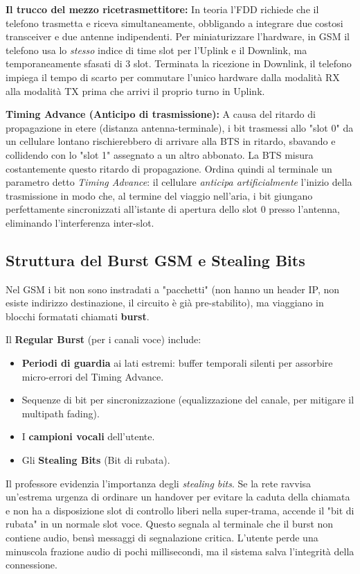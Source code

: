 \textbf{Il trucco del mezzo ricetrasmettitore:} 
In teoria l'FDD richiede che il telefono trasmetta e riceva simultaneamente, obbligando a integrare due costosi transceiver e due antenne indipendenti. Per miniaturizzare l'hardware, in GSM il telefono usa lo \textit{stesso} indice di time slot per l'Uplink e il Downlink, ma temporaneamente sfasati di 3 slot. Terminata la ricezione in Downlink, il telefono impiega il tempo di scarto per commutare l'unico hardware dalla modalità RX alla modalità TX prima che arrivi il proprio turno in Uplink.

\textbf{Timing Advance (Anticipo di trasmissione):}
A causa del ritardo di propagazione in etere (distanza antenna-terminale), i bit trasmessi allo "slot 0" da un cellulare lontano rischierebbero di arrivare alla BTS in ritardo, sbavando e collidendo con lo "slot 1" assegnato a un altro abbonato.
La BTS misura costantemente questo ritardo di propagazione. Ordina quindi al terminale un parametro detto \textit{Timing Advance}: il cellulare \textit{anticipa artificialmente} l'inizio della trasmissione in modo che, al termine del viaggio nell'aria, i bit giungano perfettamente sincronizzati all'istante di apertura dello slot 0 presso l'antenna, eliminando l'interferenza inter-slot.

\subsection{Struttura del Burst GSM e Stealing Bits}
Nel GSM i bit non sono instradati a "pacchetti" (non hanno un header IP, non esiste indirizzo destinazione, il circuito è già pre-stabilito), ma viaggiano in blocchi formatati chiamati \textbf{burst}.

Il \textbf{Regular Burst} (per i canali voce) include:
\begin{itemize}
    \item \textbf{Periodi di guardia} ai lati estremi: buffer temporali silenti per assorbire micro-errori del Timing Advance.
    \item Sequenze di bit per sincronizzazione (equalizzazione del canale, per mitigare il multipath fading).
    \item I \textbf{campioni vocali} dell'utente.
    \item Gli \textbf{Stealing Bits} (Bit di rubata).
\end{itemize}

Il professore evidenzia l'importanza degli \textit{stealing bits}. Se la rete ravvisa un'estrema urgenza di ordinare un handover per evitare la caduta della chiamata e non ha a disposizione slot di controllo liberi nella super-trama, accende il "bit di rubata" in un normale slot voce. Questo segnala al terminale che il burst non contiene audio, bensì messaggi di segnalazione critica. L'utente perde una minuscola frazione audio di pochi millisecondi, ma il sistema salva l'integrità della connessione.

